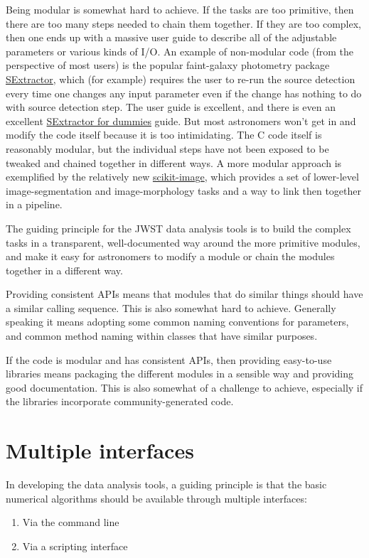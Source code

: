 \documentclass[letterpaper,10pt,english]{sphinxmanual}
\begin{document}
Being modular is somewhat hard to achieve. If the tasks are too primitive, then
there are too many steps needed to chain them together. If they are too complex,
then one ends up with a massive user guide to describe all of the adjustable
parameters or various kinds of I/O. An example of non-modular code (from the
perspective of most users) is the popular faint-galaxy photometry package
\href{http://www.astromatic.net/software/sextractor}{SExtractor},
which (for example) requires the user to re-run the source detection every time
one changes any input parameter even if the change has nothing to do with source
detection step. The user guide is excellent, and there is even an
excellent
\href{http://astroa.physics.metu.edu.tr/MANUALS/sextractor/Guide2source\_extractor.pdf}{SExtractor for dummies}
guide. But most astronomers won't get in and modify the code
itself because it is too intimidating. The C code itself is reasonably
modular, but the individual steps have not been exposed to be tweaked and
chained together in different ways. A more modular approach is exemplified
by the relatively new \href{http://scikit-image.org}{scikit-image}, which
provides a set of lower-level image-segmentation and image-morphology tasks
and a way to link then together in a pipeline.

The guiding principle for the JWST data analysis tools is to build
the complex tasks in a transparent,
well-documented way around the more primitive modules, and make it easy for
astronomers to modify a module or chain the modules together in a different way.

Providing consistent APIs means that modules that do similar things
should have a similar calling sequence. This is also somewhat hard
to achieve. Generally speaking it means adopting some common naming
conventions for parameters, and common method naming within classes
that have similar purposes.

If the code is modular and has consistent APIs, then providing easy-to-use
libraries means packaging the different modules in a sensible way
and providing good documentation. This is also somewhat of a challenge
to achieve, especially if the libraries incorporate community-generated
code.


\section{Multiple interfaces}
\label{intro:multiple-interfaces}
In developing the data analysis tools, a guiding principle is that
the basic numerical algorithms should be available through multiple
interfaces:
\begin{enumerate}
\item {} 
Via the command line

\item {} 
Via a scripting interface

\end{enumerate}
\end{document}

